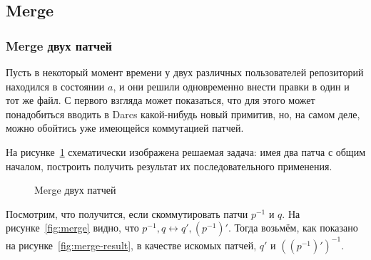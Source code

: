 \subsection{Merge}

\subsubsection{Merge двух патчей}

Пусть в некоторый момент времени у двух различных пользователей
репозиторий находился в состоянии $a$, и они решили одновременно
внести правки в один и тот же файл. С первого взгляда может
показаться, что для этого может понадобиться вводить в Darcs
какой-нибудь новый примитив, но, на самом деле, можно обойтись уже
имеющейся коммутацией патчей. 

На рисунке~\ref{fig:merge-before} схематически изображена решаемая
задача: имея два патча с общим началом, построить получить результат
их последовательного применения. 

\begin{figure}
  \centering
  \caption{Merge двух патчей}
  \label{fig:merge-before}
\end{figure}

Посмотрим, что получится, если скоммутировать патчи $p^{-1}$ и $q$. На
рисунке~\ref{fig:merge} видно, что $p^{-1}, q \longleftrightarrow q',
(p^{-1})'$. Тогда возьмём, как показано на
рисунке~\ref{fig:merge-result}, в качестве искомых патчей, $q'$ и
$((p^{-1})')^{-1}$.

